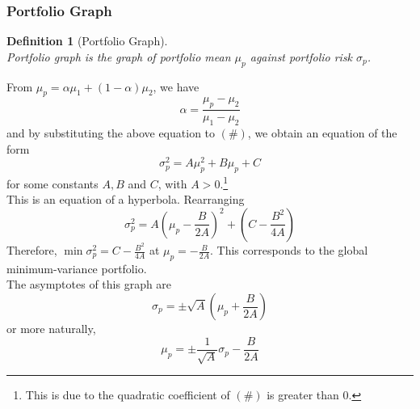 \documentclass[12pt]{article}
\newtheorem{definition}{Definition}[section]
\theoremstyle{definition}
\begin{document}
\subsubsection{Portfolio Graph}
\begin{definition}[Portfolio Graph]
\hfill\\\normalfont Portfolio graph is the graph of portfolio mean $\mu_p$ against portfolio risk $\sigma_p$.\end{definition}
From $\mu_p = \alpha\mu_1+(1-\alpha)\mu_2$, we have
\[
\alpha = \frac{\mu_p-\mu_2}{\mu_1-\mu_2}
\]
and by substituting the above equation to $(\#)$, we obtain an equation of the form
\[
\sigma_p^2 = A\mu_p^2+B\mu_p+C
\]
for some constants $A,B$ and $C$, with $A>0$.\footnote{This is due to the quadratic coefficient of $(\#)$ is greater than 0.}\\
This is an equation of a hyperbola. Rearranging
\[
\sigma_p^2 = A(\mu_p-\frac{B}{2A})^2+(C-\frac{B^2}{4A})
\]
Therefore, $\min\sigma_p^2 = C-\frac{B^2}{4A}$ at $\mu_p = -\frac{B}{2A}$. This corresponds to the global minimum-variance portfolio.\\The asymptotes of this graph are
\[
\sigma_p = \pm \sqrt{A}(\mu_p+\frac{B}{2A})
\]
or more naturally,
\[
\mu_p = \pm\frac{1}{\sqrt{A}}\sigma_p -\frac{B}{2A}
\]
\end{document}
